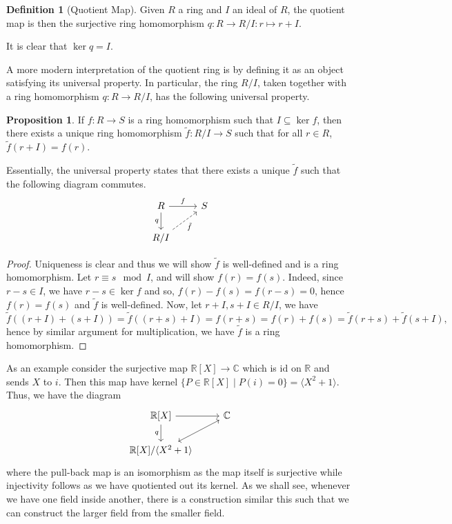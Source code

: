 \documentclass[]{article}
\theoremstyle{definition}
\theoremstyle{definition}
\newtheorem{definition}{Definition}[section]
\newtheorem{proposition}{Proposition}[section]
\begin{document}
\begin{definition}[Quotient Map]
  Given \(R\) a ring and \(I\) an ideal of \(R\), the quotient map is then the 
  surjective ring homomorphism \(q : R \to R / I : r \mapsto r + I\).
\end{definition}

It is clear that \(\ker q = I\).

A more modern interpretation of the quotient ring is by defining it as an 
object satisfying its universal property. In particular, the ring \(R / I\),
taken together with a ring homomorphism \(q : R \to R / I\), has the following 
universal property.

\begin{proposition}
  If \(f : R \to S\) is a ring homomorphism such that \(I \subseteq \ker f\), 
  then there exists a unique ring homomorphism \(\tilde f : R / I \to S\)
  such that for all \(r \in R\), \(\tilde f(r + I) = f(r)\).
\end{proposition}

Essentially, the universal property states that there exists a unique \(\tilde f\) 
such that the following diagram commutes.
\[\begin{tikzcd}
  R \arrow[r, "f"] \arrow[swap, d, "q"] & S \\
  R / I \arrow[swap, dashed, ru, "\tilde f"]
  \end{tikzcd}\]
\begin{proof}
  Uniqueness is clear and thus we will show \(\tilde f\) is well-defined and 
  is a ring homomorphism. Let \(r \equiv s \mod I\), and will show \(f(r) = f(s)\). 
  Indeed, since \(r - s \in I\), we have \(r - s \in \ker f\) and so, 
  \(f(r) - f(s) = f(r - s) = 0\), hence \(f(r) = f(s)\) and \(\tilde f\) is 
  well-defined. Now, let \(r + I, s + I \in R / I\), we have 
  \[\tilde f((r + I) + (s + I)) = \tilde f((r + s) + I) = f(r + s) = 
    f(r) + f(s) = \tilde f(r + s) + \tilde f(s + I),\]
  hence by similar argument for multiplication, we have \(\tilde f\) is a ring 
  homomorphism.
\end{proof}

As an example consider the surjective map \(\mathbb{R}[X] \to \mathbb{C}\) 
which is \(\text{id}\) on \(\mathbb{R}\) and sends \(X\) to \(i\). Then 
this map have kernel \(\{P \in \mathbb{R}[X] \mid P(i) = 0\} = 
\langle X^2 + 1 \rangle\). Thus, we have the diagram 
\[\begin{tikzcd}
  \mathbb{R}[X] \arrow[d, swap, "q"] \arrow[r] & \mathbb{C}\\
  \mathbb{R}[X] / \langle X^2 + 1 \rangle \arrow[swap, leftrightarrow, ru]
\end{tikzcd}\]
where the pull-back map is an isomorphism as the map itself is surjective while 
injectivity follows as we have quotiented out its kernel. As we shall see, 
whenever we have one field inside another, there is a construction similar this 
such that we can construct the larger field from the smaller field.
\end{document}
